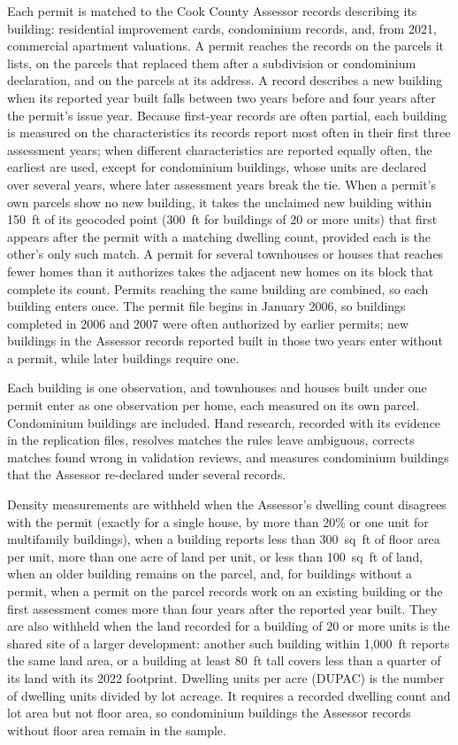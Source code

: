 Each permit is matched to the Cook County Assessor records describing its building: residential improvement cards, condominium records, and, from 2021, commercial apartment valuations.
A permit reaches the records on the parcels it lists, on the parcels that replaced them after a subdivision or condominium declaration, and on the parcels at its address.
A record describes a new building when its reported year built falls between two years before and four years after the permit's issue year.
Because first-year records are often partial, each building is measured on the characteristics its records report most often in their first three assessment years; when different characteristics are reported equally often, the earliest are used, except for condominium buildings, whose units are declared over several years, where later assessment years break the tie.
When a permit's own parcels show no new building, it takes the unclaimed new building within 150~ft of its geocoded point (300~ft for buildings of 20 or more units) that first appears after the permit with a matching dwelling count, provided each is the other's only such match.
A permit for several townhouses or houses that reaches fewer homes than it authorizes takes the adjacent new homes on its block that complete its count.
Permits reaching the same building are combined, so each building enters once.
The permit file begins in January 2006, so buildings completed in 2006 and 2007 were often authorized by earlier permits; new buildings in the Assessor records reported built in those two years enter without a permit, while later buildings require one.

Each building is one observation, and townhouses and houses built under one permit enter as one observation per home, each measured on its own parcel.
Condominium buildings are included.
Hand research, recorded with its evidence in the replication files, resolves matches the rules leave ambiguous, corrects matches found wrong in validation reviews, and measures condominium buildings that the Assessor re-declared under several records.

Density measurements are withheld when the Assessor's dwelling count disagrees with the permit (exactly for a single house, by more than 20\% or one unit for multifamily buildings), when a building reports less than 300~sq~ft of floor area per unit, more than one acre of land per unit, or less than 100~sq~ft of land, when an older building remains on the parcel, and, for buildings without a permit, when a permit on the parcel records work on an existing building or the first assessment comes more than four years after the reported year built.
They are also withheld when the land recorded for a building of 20 or more units is the shared site of a larger development: another such building within 1,000~ft reports the same land area, or a building at least 80~ft tall covers less than a quarter of its land with its 2022 footprint.
Dwelling units per acre (DUPAC) is the number of dwelling units divided by lot acreage.
It requires a recorded dwelling count and lot area but not floor area, so condominium buildings the Assessor records without floor area remain in the sample.

